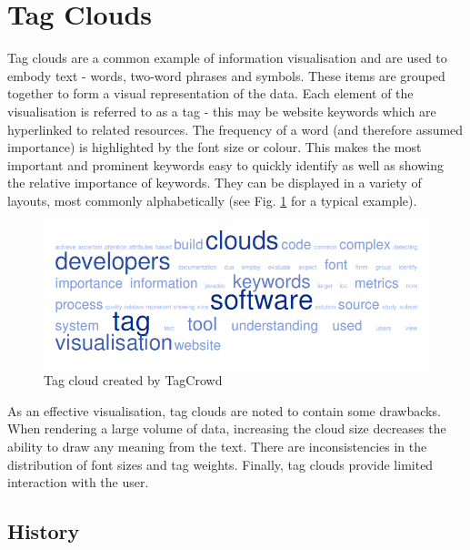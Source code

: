 
\section{Tag Clouds}

Tag clouds are a common example of information visualisation and are used to embody text - words, two-word phrases and symbols. These items are grouped together to form a visual representation of the data.  Each element of the visualisation is referred to as a tag - this may be website keywords which are hyperlinked to related resources. The frequency of a word (and therefore assumed importance) is highlighted by the font size or colour.  This makes the most important and prominent keywords easy to quickly identify as well as showing the relative importance of keywords. They can be displayed in a variety of layouts, most commonly alphabetically (see Fig. \ref{fig:tagcrowd} for a typical example).

\begin{figure}[h!]
   \centering
   \includegraphics[width=140mm]{tagcrowd.png}
  \caption{Tag cloud created by TagCrowd}
  \label{fig:tagcrowd}
\end{figure}

As an effective visualisation, tag clouds are noted to contain some drawbacks. When rendering a large volume of data, increasing the cloud size decreases the ability to draw any meaning from the text. There are inconsistencies in the distribution of font sizes and tag weights.  Finally, tag clouds provide limited interaction with the user.


\subsection{History}

